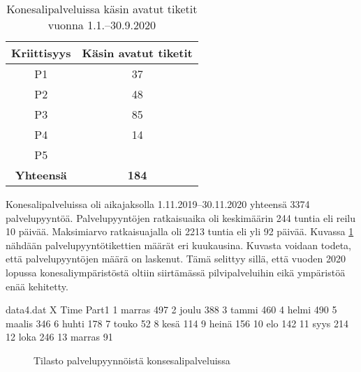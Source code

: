 \begin{table}[ht]
\centering
\begin{tabular}{||c c||} 
 \hline
 Kriittisyys & Käsin avatut tiketit \\ [0.5ex] 
 \hline\hline
 P1 & 37 \\ 
 P2 & 48 \\
 P3 & 85 \\
 P4 & 14 \\
 P5 &  \\
 \textbf{Yhteensä} & \textbf{184} \\ [1ex] 
 \hline
\end{tabular}
\caption{Konesalipalveluissa käsin avatut tiketit vuonna 1.1.--30.9.2020}
\label{table:koneautomaatti}
\end{table}

Konesalipalveluissa oli aikajaksolla 1.11.2019--30.11.2020 yhteensä 3374 palvelupyyntöä. Palvelupyyntöjen ratkaisuaika oli keskimäärin 244 tuntia eli reilu 10 päivää. Maksimiarvo ratkaisuajalla oli 2213 tuntia eli yli 92 päivää. Kuvassa \ref{fig:konepyynto} nähdään palvelupyyntötikettien määrät eri kuukausina. Kuvasta voidaan todeta, että palvelupyyntöjen määrä on laskenut. Tämä selittyy sillä, että vuoden 2020 lopussa konesaliympäristöstä oltiin siirtämässä pilvipalveluihin eikä ympäristöä enää kehitetty.

\begin{filecontents}{data4.dat}
X Time  	Part1
1 marras  	497
2 joulu		388
3 tammi 	460
4 helmi		490
5 maalis	346
6 huhti		178
7 touko		52
8 kesä      114
9 heinä     156
10 elo      142
11 syys     214
12 loka     246
13 marras   91
\end{filecontents}

\begin{figure}[ht]
\caption{Tilasto palvelupyynnöistä konsesalipalveluissa}
\label{fig:konepyynto}
\end{figure}

